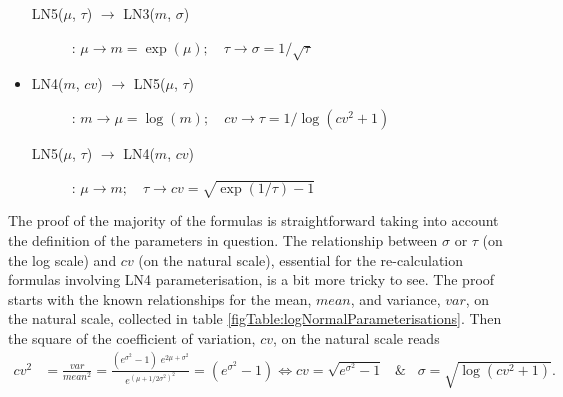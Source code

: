 \begin{itemize}
\begin{description}
\item[LN5($\mu$, $\tau$) $\rightarrow$ LN3($m$, $\sigma$)]:
$\mu \rightarrow m=\exp(\mu); \quad \tau \rightarrow \sigma=1/\sqrt{\tau}$
\end{description}

\item 
\begin{description}
\item[LN4($m$, $cv$) $\rightarrow$ LN5($\mu$, $\tau$)]:
$m \rightarrow \mu=\log(m); \quad cv \rightarrow \tau=1/\log(cv^2+1)$

\item[LN5($\mu$, $\tau$) $\rightarrow$ LN4($m$, $cv$)]:
$\mu \rightarrow m; \quad \tau \rightarrow cv=\sqrt{\exp(1/\tau)-1}$
\end{description}
\end{itemize}

The proof of the majority of the formulas is straightforward taking into account the definition
of the parameters in question. The relationship between $\sigma$ or $\tau$ (on the log scale) 
and $cv$ (on the natural scale), essential for the re-calculation formulas involving
LN4 parameterisation, is a bit more tricky to see. The 
proof starts with the known relationships for the mean, $mean$, and variance, $var$, on the natural 
scale, collected in table \ref{figTable:logNormalParameterisations}. 
Then the square of the coefficient of variation, $cv$, on the natural scale reads
\begin{align}
	cv^2 &= \frac{var}{mean^2} = \frac{(e^{\sigma^2}-1)\; e^{2\mu + \sigma^2}}{e^{(\mu + 1/2\sigma^2)^2}}
	= (e^{\sigma^2}-1) \Leftrightarrow cv = \sqrt{e^{\sigma^2}-1} \;\;\; \& \;\;\; \sigma=\sqrt{\log(cv^2 + 1)}. \nonumber
\end{align}





